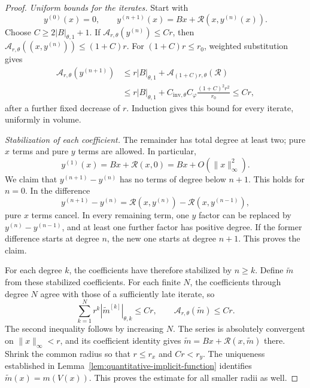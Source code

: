 \documentclass[10pt,reqno]{amsart}
\theoremstyle{definition}
\theoremstyle{remark}
\numberwithin{equation}{section}
\numberwithin{figure}{section}
\begin{document}
\begin{proof}
\emph{Uniform bounds for the iterates.} Start with
\begin{equation}\label{eq:analytic-stationary-iteration}
y^{(0)}(x)=0,\qquad
y^{(n+1)}(x)=Bx+\mathcal R(x,y^{(n)}(x)).
\end{equation}
Choose $C\ge2|B|_{\theta,1}+1$. If
$\mathcal A_{r,\theta}(y^{(n)})\le Cr$, then
$\mathcal A_{r,\theta}((x,y^{(n)}))\le(1+C)r$.
For $(1+C)r\le r_0$, weighted substitution gives
\begin{equation}\label{eq:analytic-stationary-iterate-bound}
\begin{aligned}
\mathcal A_{r,\theta}(y^{(n+1)})
&\le r|B|_{\theta,1}
+\mathcal A_{(1+C)r,\theta}(\mathcal R)\\
&\le r|B|_{\theta,1}
+C_{\mathrm{inv},\theta}C_\varphi
\frac{(1+C)^2r^2}{r_0}\le Cr,
\end{aligned}
\end{equation}
after a further fixed decrease of $r$. Induction gives this bound
for every iterate, uniformly in volume.

\emph{Stabilization of each coefficient.} The remainder has total
degree at least two; pure $x$ terms and pure $y$ terms are allowed.
In particular,
\begin{equation}\label{eq:analytic-stationary-first-iterate}
y^{(1)}(x)=Bx+\mathcal R(x,0)=Bx+O(\|x\|_\infty^2).
\end{equation}
We claim that $y^{(n+1)}-y^{(n)}$ has no terms of degree below
$n+1$. This holds for $n=0$. In the difference
\begin{equation}\label{eq:analytic-stationary-difference}
y^{(n+1)}-y^{(n)}
=\mathcal R(x,y^{(n)})-\mathcal R(x,y^{(n-1)}),
\end{equation}
pure $x$ terms cancel. In every remaining term, one $y$ factor can
be replaced by $y^{(n)}-y^{(n-1)}$, and at least one further factor
has positive degree. If the former difference starts at degree
$n$, the new one starts at degree $n+1$. This proves the claim.

For each degree $k$, the coefficients have therefore stabilized by
$n\ge k$. Define $\widetilde m$ from these stabilized coefficients.
For each finite $N$, the coefficients through degree $N$ agree with
those of a sufficiently late iterate, so
\begin{equation}\label{eq:analytic-stationary-limit-bound}
\sum_{k=1}^N r^k|\widetilde m^{[k]}|_{\theta,k}\le Cr,
\qquad
\mathcal A_{r,\theta}(\widetilde m)\le Cr.
\end{equation}
The second inequality follows by increasing $N$. The series is
absolutely convergent on $\|x\|_\infty<r$, and its coefficient
identity gives $\widetilde m=Bx+\mathcal R(x,\widetilde m)$ there.
Shrink the common radius so that $r\le r_x$ and $Cr<r_y$.
The uniqueness established in
Lemma~\ref{lem:quantitative-implicit-function} identifies
$\widetilde m(x)=m(V(x))$. This proves the estimate for all smaller
radii as well.
\end{proof}
\end{document}
